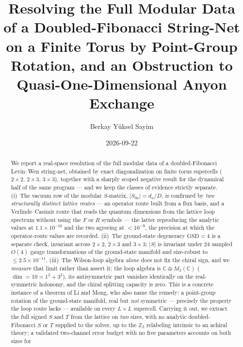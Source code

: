 \documentclass[aps,pra,twocolumn,superscriptaddress,longbibliography,floatfix,nofootinbib]{revtex4-2}
\begin{document}
\setcounter{secnumdepth}{3}

\title{Resolving the Full Modular Data of a Doubled-Fibonacci String-Net
       on a Finite Torus by Point-Group Rotation, and an Obstruction to
       Quasi-One-Dimensional Anyon Exchange}

\author{Berkay Y\"uksel Sayim}

\date{2026-09-22}

\begin{abstract}
We report a real-space resolution of the full modular data of a doubled-Fibonacci Levin--Wen
string-net, obtained by exact diagonalization on finite torus supercells ($2\times2$,
$2\times3$, $3\times3$), together with a sharply scoped negative result for the dynamical half
of the same program --- and we keep the classes of evidence strictly separate. (i)~The vacuum row of the modular
$S$-matrix, $|S_{0a}| = d_a/D$, is confirmed by \emph{two structurally distinct
lattice routes} --- an operator route built from a flux basis, and a
Verlinde--Casimir route that reads the quantum dimensions from the lattice loop
spectrum without using the $F$ or $R$ symbols --- the latter reproducing the
analytic values at $1.1\times10^{-16}$ and the two agreeing at $<10^{-9}$, the
precision at which the operator-route values are recorded. (ii)~The ground-state
degeneracy $\mathrm{GSD}=4$ is a separate check, invariant across $2\times2$,
$2\times3$ and $3\times3$; $|S|$ is invariant under $24$ sampled $O(4)$ gauge
transformations of the ground-state manifold and size-robust to
$\le2.5\times10^{-11}$. (iii)~The Wilson-loop algebra \emph{alone} does not fix
the chiral sign, and we \emph{measure} that limit rather than assert it: the
loop algebra is $\mathbb{C}\oplus M_3(\mathbb{C})$ ($\dim=10=1^{2}+3^{2}$), its
antisymmetric part vanishes identically on the real-symmetric holonomy, and the
chiral splitting capacity is zero. This is a concrete instance of a theorem of
Li and Mong, who also name the remedy: a point-group rotation of the
ground-state manifold, real but \emph{not} symmetric --- precisely the property the loop route
lacks --- available on every $L\times L$ supercell. Carrying it out, we extract
the full signed $S$ and $T$ from the lattice on \emph{two} sizes, with no
analytic doubled-Fibonacci $S$ or $T$ supplied to the solver, up to the
$\mathbb{Z}_2$ relabeling intrinsic to an achiral theory; a validated
two-channel error budget with no free parameters accounts on both sizes for

\end{abstract}
\end{document}
